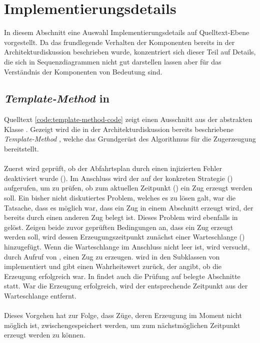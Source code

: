 \section{Implementierungsdetails}

In diesem Abschnitt eine Auswahl Implementierungsdetails auf Quelltext-Ebene vorgestellt. Da das frundlegende Verhalten der Komponenten bereits in der Architekturdiskussion beschrieben wurde, konzentriert sich dieser Teil auf Details, die sich in Sequenzdiagrammen nicht gut darstellen lassen aber für das Verständnis der Komponenten von Bedeutung sind.

\subsection{\emph{Template-Method} in }

Quelltext \ref{code:template-method-code} zeigt einen Ausschnitt aus der abstrakten Klasse . Gezeigt wird die in der Architekturdiskussion bereits beschriebene \emph{Template-Method} , welche das Grundgerüst des Algorithmus für die Zugerzeugung bereitstellt.\\
\\
Zuerst wird geprüft, ob der Abfahrtsplan durch einen injizierten Fehler deaktiviert wurde (). Im Anschluss wird der  auf der konkreten Strategie () aufgerufen, um zu prüfen, ob zum aktuellen Zeitpunkt () ein Zug erzeugt werden soll. Ein bisher nicht diskutiertes Problem, welches es zu lösen galt, war die Tatsache, dass es möglich war, dass ein Zug in einem Abschnitt erzeugt wird, der bereits durch einen anderen Zug belegt ist. Dieses Problem wird ebenfalls in  gelöst. Zeigen beide zuvor geprüften Bedingungen an, dass ein Zug erzeugt werden soll, wird dessen Erzeugungszeitpunkt zunächst einer Warteschlange () hinzugefügt. Wenn die Warteschlange im Anschluss nicht leer ist, wird versucht, durch Aufruf von , einen Zug zu erzeugen.  wird in den Subklassen von  implementiert und gibt einen Wahrheitswert zurück, der angibt, ob die Erzeugung erfolgreich war. In  findet auch die Prüfung auf belegte Abschnitte statt. War die Erzeugung erfolgreich, wird der entsprechende Zeitpunkt aus der Warteschlange entfernt.\\
\\
Dieses Vorgehen hat zur Folge, dass Züge, deren Erzeugung im Moment nicht möglich ist, zwischengespeichert werden, um zum nächstmöglichen Zeitpunkt erzeugt werden zu können.

